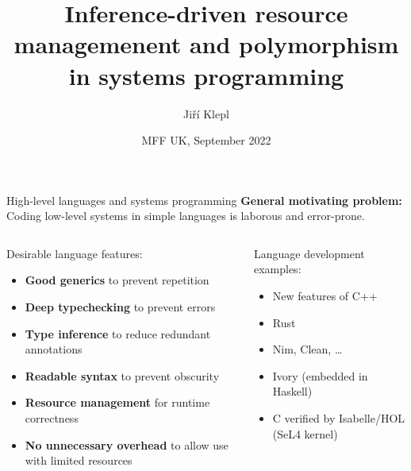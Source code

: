 \documentclass[aspectratio=169]{beamer}
\author{Jiří Klepl}
\title{Inference-driven resource managemenent and polymorphism in systems programming}
\date{MFF UK, September 2022}
\begin{document}
\maketitle

\begin{frame}{High-level languages and systems programming}
\textbf{General motivating problem:}\\
Coding low-level systems in simple languages is laborous and error-prone.

\vspace{5ex}
\begin{columns}
\begin{column}{.5\linewidth}
Desirable language features:
\begin{itemize}\scriptsize
\item \textbf{Good generics} to prevent repetition
\item \textbf{Deep typechecking} to prevent errors
\item \textbf{Type inference} to reduce redundant annotations
\item \textbf{Readable syntax} to prevent obscurity
\item \textbf{Resource management} for runtime correctness
\item \textbf{No unnecessary overhead} to allow use with limited resources
\end{itemize}
\end{column}\pause
\begin{column}{.5\linewidth}
Language development examples:
  \begin{itemize}\scriptsize
  \item New features of C++
  \item Rust
  \item Nim, Clean, \dots
  \item Ivory (embedded in Haskell)
  \item C verified by Isabelle/HOL (SeL4 kernel)
  \end{itemize}
\end{column}
\end{columns}
\end{frame}
\end{document}
